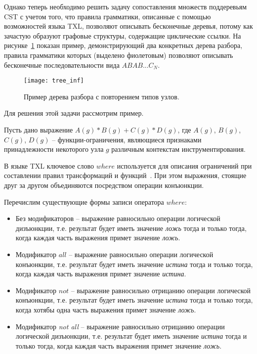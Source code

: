 Однако теперь необходимо решить задачу сопоставления множеств поддеревьям CST с учетом того, что правила грамматики, описанные с помощью возможностей языка TXL, позволяют описывать бесконечные деревья, потому как зачастую образуют графовые структуры, содержащие циклические ссылки.
На рисунке~\ref{fig:tree-inf} показан пример, демонстрирующий два конкретных дерева разбора, правила грамматики которых (выделено фиолетовым) позволяют описывать бесконечные последовательности вида $ABAB ... {C_N}$.

\begin{figure}[!h]
	\centering
	\texttt{[image: tree\_inf]}
	\caption{Пример дерева разбора с повторением типов узлов.}
	\label{fig:tree-inf}
\end{figure}

Для решения этой задачи рассмотрим пример.

Пусть дано выражение $A(g) * B(g) + C(g) * D(g)$, где $A(g)$, $B(g)$, $C(g)$, $D(g)$ -- функции-ограничения, являющиеся признаками принадлежности некоторого узла $g$ различным контекстам инструментирования.

В языке TXL ключевое слово $where$ используется для описания ограничений при составлении правил трансформаций и функций~\cite{txl-book}.
При этом выражения, стоящие друг за другом объединяются посредством операции конъюнкции.

Перечислим существующие формы записи оператора $where$:
\begin{itemize}[noitemsep]
  \item Без модификаторов -- выражение равносильно операции логической дизъюнкции, т.е. результат будет иметь значение \textit{ложь} тогда и только тогда, когда каждая часть выражения примет значение \textit{ложь}.
  \item Модификатор $all$ -- выражение равносильно операции логической конъюнкции, т.е. результат будет иметь значение \textit{истина} тогда и только тогда, когда каждая часть выражения примет значение \textit{истина}.
  \item Модификатор $not$ -- выражение равносильно отрицанию операции логической конъюнкции, т.е. результат будет иметь значение \textit{истина} тогда и только тогда, когда хотябы одна часть выражения примет значение \textit{ложь}.
  \item Модификатор \textit{not all} -- выражение равносильно отрицанию операции логической дизъюнкции, т.е. результат будет иметь значение \textit{истина} тогда и только тогда, когда каждая часть выражения примет значение \textit{ложь}.
\end{itemize}

